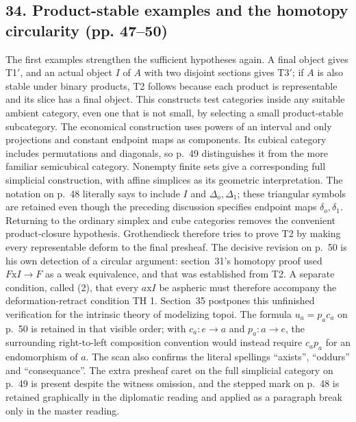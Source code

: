 \documentclass[10pt,oneside]{book}
\begin{document}
\subsection*{34. Product-stable examples and the homotopy circularity (pp. 47--50)}
The first examples strengthen the sufficient hypotheses again. A final object gives T1$'$, and an actual object $I$ of $A$ with two disjoint sections gives T3$'$; if $A$ is also stable under binary products, T2 follows because each product is representable and its slice has a final object. This constructs test categories inside any suitable ambient category, even one that is not small, by selecting a small product-stable subcategory. The economical construction uses powers of an interval and only projections and constant endpoint maps as components. Its cubical category includes permutations and diagonals, so p.~49 distinguishes it from the more familiar semicubical category. Nonempty finite sets give a corresponding full simplicial construction, with affine simplices as its geometric interpretation. The notation on p.~48 literally says to include $I$ and $\Delta_o,\Delta_1$; these triangular symbols are retained even though the preceding discussion specifies endpoint maps $\delta_o,\delta_1$. Returning to the ordinary simplex and cube categories removes the convenient product-closure hypothesis. Grothendieck therefore tries to prove T2 by making every representable deform to the final presheaf. The decisive revision on p.~50 is his own detection of a circular argument: section~31's homotopy proof used $F\mathrm{x}I\to F$ as a weak equivalence, and that was established from T2. A separate condition, called (2), that every $a\mathrm{x}I$ be aspheric must therefore accompany the deformation-retract condition TH 1. Section~35 postpones this unfinished verification for the intrinsic theory of modelizing topoi. The formula $u_a=p_a c_a$ on p.~50 is retained in that visible order; with $c_a:e\to a$ and $p_a:a\to e$, the surrounding right-to-left composition convention would instead require $c_a p_a$ for an endomorphism of $a$. The scan also confirms the literal spellings ``axists'', ``oddurs'' and ``consequance''. The extra presheaf caret on the full simplicial category on p.~49 is present despite the witness omission, and the stepped mark on p.~48 is retained graphically in the diplomatic reading and applied as a paragraph break only in the master reading.
\end{document}
